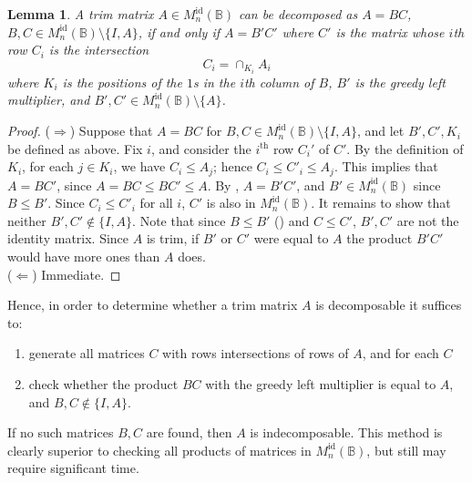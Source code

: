 \documentclass[11pt]{article}
\newtheorem{lemma}[thm]{Lemma}
\numberwithin{equation}{section}
\newcommand{\B}{\mathbb{B}}
\newcommand{\Refn}{M_n^{\text{id}}(\B)}
\begin{document}
\begin{lemma}
  A trim matrix $A \in \Refn$ can be decomposed as $A = BC$, $B, C \in
  \Refn\setminus\{I, A\}$, if and only if $A = B'C'$ where $C'$ is the matrix
  whose $i$th row $C_i$ is the intersection 
  \[ C_i = \cap_{K_i} A_i \]
  where $K_i$ is the positions of the $1$s in the $i$th column of $B$, $B'$ is
  the greedy left multiplier, and $B', C' \in \Refn \setminus\{A\}$.
\end{lemma}
\begin{proof}
  ($\Rightarrow$)
  Suppose that $A = BC$ for $B, C \in \Refn \setminus\{I, A\}$, and let $B', C',
  K_i$ be defined as above. Fix $i$, and consider the $i^{\text{th}}$ row $C_i'$
  of $C'$. By the definition of $K_i$, for each $j \in K_i$, we have $C_i \leq
  A_j$; hence $C_i \leq C'_i \leq A_j$. This implies that $A = BC'$, since $A =
  BC \leq BC' \leq A$. By , $A = B'C'$, and $B' \in
  \Refn$ since $B \leq B'$. Since $C_i \leq C'_i$ for all $i$, $C'$ is also in
  $\Refn$. It remains to show that neither $B', C' \not\in \{I, A\}$. Note
  that since $B \leq B'$ () and $C \leq C'$, $B', C'$
  are not the identity matrix. Since $A$ is trim, if $B'$ or $C'$ were equal
  to $A$ the product $B'C'$ would have more ones than $A$ does.\\
  ($\Leftarrow$) Immediate.
\end{proof}
Hence, in order to determine whether a trim matrix $A$ is decomposable it
suffices to:
\begin{enumerate}
  \item generate all matrices $C$ with rows intersections of rows of $A$, and
    for each $C$
  \item check whether the product $BC$ with the greedy left multiplier is equal
    to $A$, and $B, C \not\in \{I, A\}$.
\end{enumerate}
If no such matrices $B, C$ are found, then $A$ is indecomposable. This method is
clearly superior to checking all products of matrices in $\Refn$, but still may
require significant time.\\
\end{document}
